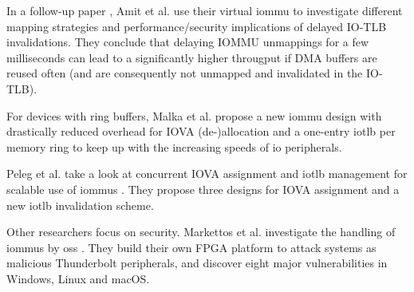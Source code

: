In a follow-up paper \cite{amit2011viommu}, Amit et al. use their virtual
\ac{iommu} to investigate different mapping strategies and performance/security
implications of delayed IO-TLB invalidations. They conclude that delaying IOMMU
unmappings for a few milliseconds can lead to a significantly higher througput
if DMA buffers are reused often (and are consequently not unmapped and
invalidated in the IO-TLB).

For devices with ring buffers, Malka et al. propose a new \ac{iommu} design with
drastically reduced overhead for IOVA (de-)allocation and a one-entry \ac{iotlb}
per memory ring \cite{malka2015riommu} to keep up with the increasing speeds of
\ac{io} peripherals.

Peleg et al. take a look at concurrent IOVA assignment and \ac{iotlb} management
for scalable use of \acp{iommu} \cite{peleg2015utilizing}. They propose three
designs for IOVA assignment and a new \ac{iotlb} invalidation scheme.

Other researchers focus on security. Markettos et al. investigate the handling
of \acp{iommu} by \aclp{os} \cite{markettos2019thunderclap}. They build their
own FPGA platform to attack systems as malicious Thunderbolt peripherals, and
discover eight major vulnerabilities in Windows, Linux and macOS.

